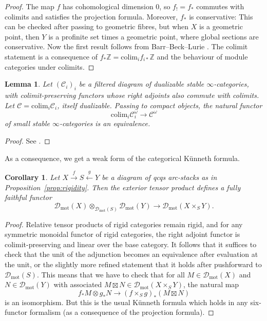 \documentclass[11pt]{amsart}
\numberwithin{equation}{section}
\numberwithin{theorem}{section}
\newtheorem{lemma}[theorem]{Lemma}
\newtheorem{corollary}[theorem]{Corollary}
\theoremstyle{definition}
\begin{document}
\begin{proof} The map $f$ has cohomological dimension $0$, so $f_!=f_\ast$ commutes with colimits and satisfies the projection formula. Moreover, $f_\ast$ is conservative: This can be checked after passing to geometric fibres, but when $X$ is a geometric point, then $Y$ is a profinite set times a geometric point, where global sections are conservative. Now the first result follows from Barr--Beck--Lurie \cite[Theorem 4.7.3.5]{LurieHA}. The colimit statement is a consequence of $f_\ast \mathbb Z= \mathrm{colim}_i f_{i\ast} \mathbb Z$ and the behaviour of module categories under colimits.
\end{proof}

\begin{lemma}\label{lem:spreadingcompactobjects} Let $(\mathcal C_i)_i$ be a filtered diagram of dualizable stable $\infty$-categories, with colimit-preserving functors whose right adjoints also commute with colimits. Let $\mathcal C=\mathrm{colim}_i \mathcal C_i$, itself dualizable. Passing to compact objects, the natural functor
\[
\mathrm{colim}_i \mathcal C_i^\omega\to \mathcal C^\omega
\]
of small stable $\infty$-categories is an equivalence.
\end{lemma}

\begin{proof} See \cite[Proposition 1.72]{EfimovDualizable}.
\end{proof}

As a consequence, we get a weak form of the categorical K\"unneth formula.

\begin{corollary}\label{cor:weakkunneth} Let $X\xrightarrow{f} S\xleftarrow{g} Y$ be a diagram of qcqs arc-stacks as in Proposition~\ref{prop:rigidity}. Then the exterior tensor product defines a fully faithful functor
\[
\mathcal D_{\mathrm{mot}}(X)\otimes_{\mathcal D_{\mathrm{mot}}(S)} \mathcal D_{\mathrm{mot}}(Y)\to \mathcal D_{\mathrm{mot}}(X\times_S Y).
\]
\end{corollary}

\begin{proof} Relative tensor products of rigid categories remain rigid, and for any symmetric monoidal functor of rigid categories, the right adjoint functor is colimit-preserving and linear over the base category. It follows that it suffices to check that the unit of the adjunction becomes an equivalence after evaluation at the unit, or the slightly more refined statement that it holds after pushforward to $\mathcal D_{\mathrm{mot}}(S)$. This means that we have to check that for all $M\in \mathcal D_{\mathrm{mot}}(X)$ and $N\in \mathcal D_{\mathrm{mot}}(Y)$ with associated $M\boxtimes N\in \mathcal D_{\mathrm{mot}}(X\times_S Y)$, the natural map
\[
f_\ast M\otimes g_\ast N\to (f\times_S g)_\ast(M\boxtimes N)
\]
is an isomorphism. But this is the usual K\"unneth formula which holds in any six-functor formalism (as a consequence of the projection formula).
\end{proof}
\end{document}
